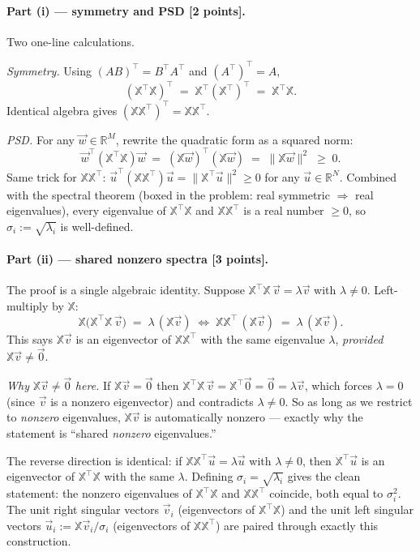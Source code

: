 \documentclass[12pt,a4paper]{article}
\begin{document}
\paragraph{Part (i) --- symmetry and PSD [2 points].} Two one-line calculations.

\emph{Symmetry.} Using $(AB)^\top = B^\top A^\top$ and $(A^\top)^\top = A$,
\[
(\mathbb{X}^\top\mathbb{X})^\top \;=\; \mathbb{X}^\top (\mathbb{X}^\top)^\top \;=\; \mathbb{X}^\top\mathbb{X}.
\]
Identical algebra gives $(\mathbb{X}\mathbb{X}^\top)^\top = \mathbb{X}\mathbb{X}^\top$.

\emph{PSD.} For any $\vec w \in \mathbb{R}^M$, rewrite the quadratic form as a squared norm:
\[
\vec w^\top(\mathbb{X}^\top\mathbb{X})\vec w \;=\; (\mathbb{X}\vec w)^\top(\mathbb{X}\vec w) \;=\; \lVert \mathbb{X}\vec w\rVert^2 \;\ge\; 0.
\]
Same trick for $\mathbb{X}\mathbb{X}^\top$: $\vec u^\top(\mathbb{X}\mathbb{X}^\top)\vec u = \lVert\mathbb{X}^\top\vec u\rVert^2 \ge 0$ for any $\vec u\in\mathbb{R}^N$. Combined with the spectral theorem (boxed in the problem: real symmetric $\Rightarrow$ real eigenvalues), every eigenvalue of $\mathbb{X}^\top\mathbb{X}$ and $\mathbb{X}\mathbb{X}^\top$ is a real number $\ge 0$, so $\sigma_i := \sqrt{\lambda_i}$ is well-defined.

\paragraph{Part (ii) --- shared nonzero spectra [3 points].} The proof is a single algebraic identity. Suppose $\mathbb{X}^\top\mathbb{X}\,\vec v = \lambda\vec v$ with $\lambda \ne 0$. Left-multiply by $\mathbb{X}$:
\[
\mathbb{X}\bigl(\mathbb{X}^\top\mathbb{X}\,\vec v\bigr) \;=\; \lambda\,(\mathbb{X}\vec v) \;\Longleftrightarrow\; \mathbb{X}\mathbb{X}^\top\,(\mathbb{X}\vec v) \;=\; \lambda\,(\mathbb{X}\vec v).
\]
This says $\mathbb{X}\vec v$ is an eigenvector of $\mathbb{X}\mathbb{X}^\top$ with the same eigenvalue $\lambda$, \emph{provided $\mathbb{X}\vec v \ne \vec 0$}.

\emph{Why} $\mathbb{X}\vec v\ne\vec 0$ \emph{here.} If $\mathbb{X}\vec v = \vec 0$ then $\mathbb{X}^\top\mathbb{X}\,\vec v = \mathbb{X}^\top\vec 0 = \vec 0 = \lambda\vec v$, which forces $\lambda = 0$ (since $\vec v$ is a nonzero eigenvector) and contradicts $\lambda\ne 0$. So as long as we restrict to \emph{nonzero} eigenvalues, $\mathbb{X}\vec v$ is automatically nonzero --- exactly why the statement is ``shared \emph{nonzero} eigenvalues.''

The reverse direction is identical: if $\mathbb{X}\mathbb{X}^\top\vec u = \lambda\vec u$ with $\lambda \ne 0$, then $\mathbb{X}^\top\vec u$ is an eigenvector of $\mathbb{X}^\top\mathbb{X}$ with the same $\lambda$. Defining $\sigma_i = \sqrt{\lambda_i}$ gives the clean statement: the nonzero eigenvalues of $\mathbb{X}^\top\mathbb{X}$ and $\mathbb{X}\mathbb{X}^\top$ coincide, both equal to $\sigma_i^2$. The unit right singular vectors $\vec v_i$ (eigenvectors of $\mathbb{X}^\top\mathbb{X}$) and the unit left singular vectors $\vec u_i := \mathbb{X}\vec v_i/\sigma_i$ (eigenvectors of $\mathbb{X}\mathbb{X}^\top$) are paired through exactly this construction.
\end{document}
